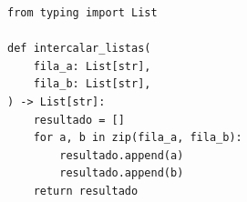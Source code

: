 \ifmostrarGabarito
\begin{verbatim}
from typing import List

def intercalar_listas(
    fila_a: List[str],
    fila_b: List[str],
) -> List[str]:
    resultado = []
    for a, b in zip(fila_a, fila_b):
        resultado.append(a)
        resultado.append(b)
    return resultado
\end{verbatim}

\fi
